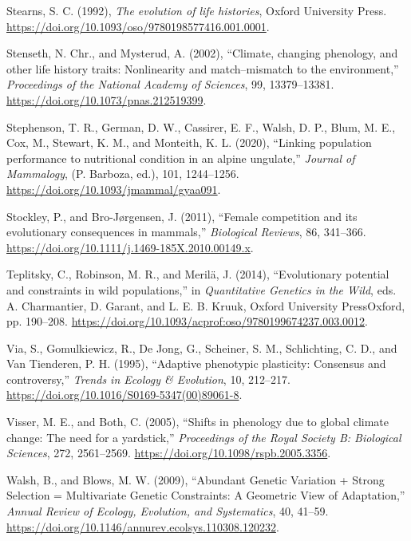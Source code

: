 \documentclass[
  12pt,
  letterpaper,
]{scrartcl}
\newlength{\cslhangindent}
\newenvironment{CSLReferences}[2] %
 {\begin{list}{}{%
  \setlength{\itemindent}{0pt}
  \setlength{\leftmargin}{0pt}
  \setlength{\parsep}{0pt}
  \ifodd #1
   \setlength{\leftmargin}{\cslhangindent}
   \setlength{\itemindent}{-1\cslhangindent}
  \fi
  \setlength{\itemsep}{#2\baselineskip}}}
 {\end{list}}
\begin{document}
\begin{CSLReferences}{1}{0}
Stearns, S. C. (1992), \emph{The evolution of life histories}, Oxford
University Press.
\url{https://doi.org/10.1093/oso/9780198577416.001.0001}.

Stenseth, N. Chr., and Mysterud, A. (2002), {``Climate, changing
phenology, and other life history traits: {Nonlinearity} and
match--mismatch to the environment,''} \emph{Proceedings of the National
Academy of Sciences}, 99, 13379--13381.
\url{https://doi.org/10.1073/pnas.212519399}.

Stephenson, T. R., German, D. W., Cassirer, E. F., Walsh, D. P., Blum,
M. E., Cox, M., Stewart, K. M., and Monteith, K. L. (2020), {``Linking
population performance to nutritional condition in an alpine
ungulate,''} \emph{Journal of Mammalogy}, (P. Barboza, ed.), 101,
1244--1256. \url{https://doi.org/10.1093/jmammal/gyaa091}.

Stockley, P., and Bro-Jørgensen, J. (2011), {``Female competition and
its evolutionary consequences in mammals,''} \emph{Biological Reviews},
86, 341--366. \url{https://doi.org/10.1111/j.1469-185X.2010.00149.x}.

Teplitsky, C., Robinson, M. R., and Merilä, J. (2014), {``Evolutionary
potential and constraints in wild populations,''} in \emph{Quantitative
{Genetics} in the {Wild}}, eds. A. Charmantier, D. Garant, and L. E. B.
Kruuk, Oxford University PressOxford, pp. 190--208.
\url{https://doi.org/10.1093/acprof:oso/9780199674237.003.0012}.

Via, S., Gomulkiewicz, R., De Jong, G., Scheiner, S. M., Schlichting, C.
D., and Van Tienderen, P. H. (1995), {``Adaptive phenotypic plasticity:
{Consensus} and controversy,''} \emph{Trends in Ecology \& Evolution},
10, 212--217. \url{https://doi.org/10.1016/S0169-5347(00)89061-8}.

Visser, M. E., and Both, C. (2005), {``Shifts in phenology due to global
climate change: {The} need for a yardstick,''} \emph{Proceedings of the
Royal Society B: Biological Sciences}, 272, 2561--2569.
\url{https://doi.org/10.1098/rspb.2005.3356}.

Walsh, B., and Blows, M. W. (2009), {``Abundant {Genetic Variation} +
{Strong Selection} = {Multivariate Genetic Constraints}: {A Geometric
View} of {Adaptation},''} \emph{Annual Review of Ecology, Evolution, and
Systematics}, 40, 41--59.
\url{https://doi.org/10.1146/annurev.ecolsys.110308.120232}.


\end{CSLReferences}
\end{document}
